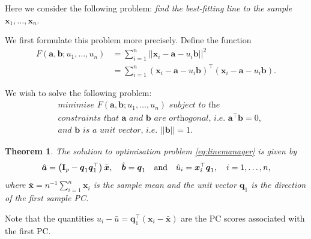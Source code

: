 \documentclass[]{book}
\newtheorem{theorem}{Theorem}[chapter]
\theoremstyle{definition}
\theoremstyle{definition}
\theoremstyle{definition}
\theoremstyle{remark}
\begin{document}
Here we consider the following problem: \emph{find the best-fitting line to the sample}
\(\boldsymbol x_1, \ldots , \boldsymbol x_n\).

We first formulate this problem more precisely. Define the function
\begin{align*}
F(\boldsymbol a, \boldsymbol b; u_1, \ldots , u_n)&=\sum_{i=1}^n \vert \vert \boldsymbol x_i - \boldsymbol a- u_i \boldsymbol b\vert \vert^2\\
& =\sum_{i=1}^n (\boldsymbol x_i - \boldsymbol a-u_i \boldsymbol b)^\top (\boldsymbol x_i - \boldsymbol a-u_i \boldsymbol b).
\end{align*}

We wish to solve the following problem:
\begin{align}
&\textit{minimise $F(\boldsymbol a, \boldsymbol b; u_1, \ldots , u_n)$ subject to the}\nonumber \\
&\textit{constraints that $\boldsymbol a$ and $\boldsymbol b$ are orthogonal, i.e. $\boldsymbol a^\top \boldsymbol b=0$,}\label{eq:linemanager}\\
&\textit{and $\boldsymbol b$ is a unit vector, i.e. $\vert \vert \boldsymbol b\vert \vert =1$.} \nonumber
\end{align}

\begin{theorem}
\protect\hypertarget{thm:unnamed-chunk-11}{}{\label{thm:unnamed-chunk-11} }The solution to optimisation problem \eqref{eq:linemanager}
is given by
\begin{equation}
\hat{\boldsymbol a}=\left ({\mathbf I}_p-\boldsymbol q_1 \boldsymbol q_1^\top\right)\bar{\boldsymbol x}, \quad \hat{\boldsymbol b}= \boldsymbol q_1 \quad
\hbox{and} \quad \hat{u}_i=\boldsymbol x_i^\top \boldsymbol q_1, \quad i=1,\ldots , n,
\label{eq:hatitems}
\end{equation}
where \(\bar{\boldsymbol x}=n^{-1}\sum_{i=1}^n \boldsymbol x_i\) is the sample mean and the unit vector \(\boldsymbol q_1\) is the direction of the first sample PC.
\end{theorem}

Note that the quantities \(u_i -\bar{u}=\boldsymbol q_1^\top (\boldsymbol x_i-\bar{\boldsymbol x})\) are the PC scores associated with the first PC.
\end{document}
